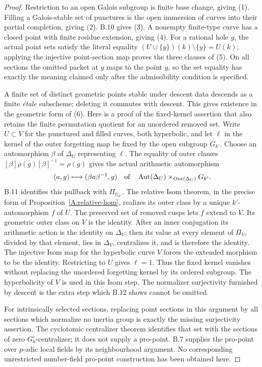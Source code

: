 \documentclass[11pt,oneside]{article}
\begin{document}
\begin{proof}
Restriction to an open Galois subgroup is finite base change, giving
(1).  Filling a Galois-stable set of punctures is the open immersion
of curves into their partial completion, giving (2).  B.10 gives
(3).  A nonempty finite-type curve has a closed point with finite
residue extension, giving (4).
For a rational hole $y$, the actual point sets satisfy the literal
equality $(U\cup\{y\})(k)\setminus\{y\}=U(k)$; applying the
injective point-section map proves the three clauses of (5).
On all sections the omitted packet at $y$ maps to the point $y$,
so the set equality has exactly the meaning claimed only after the
admissibility condition is specified.

A finite set of distinct geometric points stable under descent data
descends as a finite \emph{\'etale} subscheme; deleting it commutes
with descent.  This gives existence in the geometric form of (6).
Here is a proof of the fixed-kernel assertion that also retains the
finite permutation quotient for an unordered removed set.  Write
$U\subset V$ for the punctured and filled curves, both hyperbolic,
and let $\ell$ in the kernel of the outer forgetting map be fixed
by the open subgroup $G_{k'}$.  Choose an automorphism $\beta$ of
$\Delta_U$ representing $\ell$.  The equality of outer classes
$[\beta]\rho(g)[\beta]^{-1}=\rho(g)$ gives the actual arithmetic
automorphism
\[
 (a,g)\longmapsto(\beta a\beta^{-1},g)
 \quad\hbox{of}\quad
 \operatorname{Aut}(\Delta_U)
       \times_{\operatorname{Out}(\Delta_U)}G_{k'}.
\]
B.11 identifies this pullback with $\Pi_{U_{k'}}$.
The relative Isom theorem, in the precise form of
Proposition~\ref{A:relative-hom}, realizes its outer class by a
unique $k'$-automorphism $f$ of $U$.  The preserved set of removed
cusps lets $f$ extend to $V$.  Its geometric outer class on $V$ is
the identity.  After an inner conjugation its arithmetic action
is the identity on $\Delta_V$; then its value at every element of
$\Pi_V$, divided by that element, lies in $\Delta_V$, centralizes it, and
is therefore the identity.  The injective Isom map for the
hyperbolic curve $V$ forces the extended morphism to be the
identity.  Restricting to $U$ gives $\ell=1$.
Thus the fixed kernel vanishes without replacing the unordered
forgetting kernel by its ordered subgroup.  The hyperbolicity of
$V$ is used in this Isom step.
The normalizer surjectivity furnished by descent is the extra step
which B.12 shows cannot be omitted.

For intrinsically selected sections, replacing point sections in this
argument by all sections which normalize no inertia group is exactly
the missing surjectivity assertion.  The cyclotomic centralizer
theorem identifies that set with the sections of zero
$G_k^\circ$-centralizer; it does not supply a pro-point.  B.7 supplies
the pro-point over $p$-adic local fields by its neighbourhood argument.
No corresponding unrestricted number-field pro-point construction
has been obtained here.
\end{proof}
\end{document}
